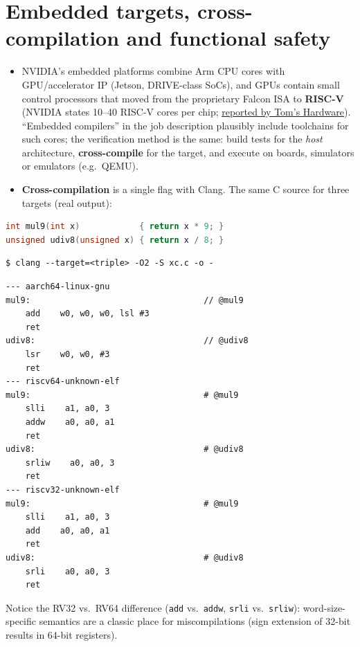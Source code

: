 \documentclass[10pt,a4paper,openany,oneside]{report}
\newcommand{\prio}[1]{\texorpdfstring{\ifcase#1\or{\color{gold}\ding{72}}\or{\color{gold}\ding{72}\ding{72}}\or{\color{gold}\ding{72}\ding{72}\ding{72}}\fi}{}}
\newcommand{\src}[2]{\href{#1}{\textcolor{srcorange}{\underline{#2}}}}   %
\begin{document}
\section{Embedded targets, cross-compilation and functional safety \prio{2}}
\begin{itemize}[nosep]
\item NVIDIA's embedded platforms combine Arm CPU cores with GPU/accelerator IP (Jetson, DRIVE-class SoCs), and GPUs contain small control processors that moved from the proprietary Falcon ISA to \textbf{RISC-V} (NVIDIA states 10--40 RISC-V cores per chip; \src{https://tomshardware.com/pc-components/gpus/nvidia-to-ship-a-billion-of-risc-v-cores-in-2024}{reported by Tom's Hardware}). ``Embedded compilers'' in the job description plausibly include toolchains for such cores; the verification method is the same: build tests for the \emph{host} architecture, \textbf{cross-compile} for the target, and execute on boards, simulators or emulators (e.g.\ QEMU).
\item \textbf{Cross-compilation} is a single flag with Clang. The same C source for three targets (real output):
\end{itemize}
\begin{lstlisting}[language={C}]
int mul9(int x)            { return x * 9; }
unsigned udiv8(unsigned x) { return x / 8; }
\end{lstlisting}
\begin{lstlisting}[style=shcmd]
$ clang --target=<triple> -O2 -S xc.c -o -
\end{lstlisting}
\begin{lstlisting}[style=out]
--- aarch64-linux-gnu
mul9:                                   // @mul9
    add    w0, w0, w0, lsl #3
    ret
udiv8:                                  // @udiv8
    lsr    w0, w0, #3
    ret
--- riscv64-unknown-elf
mul9:                                   # @mul9
    slli    a1, a0, 3
    addw    a0, a0, a1
    ret
udiv8:                                  # @udiv8
    srliw    a0, a0, 3
    ret
--- riscv32-unknown-elf
mul9:                                   # @mul9
    slli    a1, a0, 3
    add    a0, a0, a1
    ret
udiv8:                                  # @udiv8
    srli    a0, a0, 3
    ret
\end{lstlisting}
Notice the RV32 vs.\ RV64 difference (\texttt{add} vs.\ \texttt{addw}, \texttt{srli} vs.\ \texttt{srliw}): word-size-specific semantics are a classic place for miscompilations (sign extension of 32-bit results in 64-bit registers).
\end{document}

